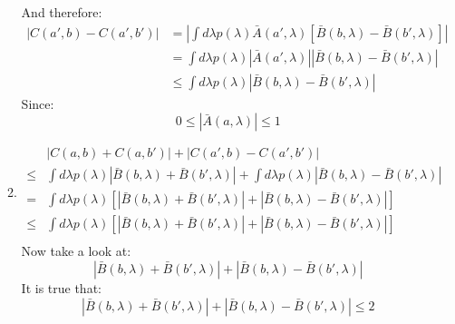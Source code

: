 \documentclass[12pt,a4]{article}
\begin{document}
\begin{enumerate}
\begin{enumerate}
        And therefore:
        \begin{align*}
          |C(a',b) - C(a',b')| 
                             &= \left|\int d\lambda p(\lambda) \bar{A}(a', \lambda)\left[\bar{B}(b, \lambda) - \bar{B}(b', \lambda)\right]\right|\\
                             &= \int d\lambda p(\lambda) \left|\bar{A}(a', \lambda)\right| \left|\bar{B}(b, \lambda) - \bar{B}(b', \lambda)\right|\\
                             &\leq \int d\lambda p(\lambda) \left|\bar{B}(b, \lambda) - \bar{B}(b', \lambda)\right|
        \end{align*}
        Since:
        \begin{equation*}
          0 \le \left|\bar{A}(a, \lambda)\right| \le 1
        \end{equation*}
      \item
        \begin{align*}
          & |C(a,b) + C(a,b')| + |C(a',b) - C(a',b')|\\
          \leq & \int d\lambda p(\lambda) \left|\bar{B}(b, \lambda) + \bar{B}(b', \lambda)\right| + \int d\lambda p(\lambda) \left|\bar{B}(b, \lambda) - \bar{B}(b', \lambda)\right|\\
             = & \int d\lambda p(\lambda) \left[\left|\bar{B}(b, \lambda) + \bar{B}(b', \lambda)\right| + \left|\bar{B}(b, \lambda) - \bar{B}(b', \lambda)\right|\right]\\
          \leq & \int d\lambda p(\lambda) \left[\left|\bar{B}(b, \lambda) + \bar{B}(b', \lambda)\right| + \left|\bar{B}(b, \lambda) - \bar{B}(b', \lambda)\right|\right]\\
        \end{align*}
        Now take a look at:
        \begin{equation*}
          \left|\bar{B}(b, \lambda) + \bar{B}(b', \lambda)\right| + \left|\bar{B}(b, \lambda) - \bar{B}(b', \lambda)\right|
        \end{equation*}
        It is true that:
        \begin{equation*}
          \left|\bar{B}(b, \lambda) + \bar{B}(b', \lambda)\right| + \left|\bar{B}(b, \lambda) - \bar{B}(b', \lambda)\right| \le 2
        \end{equation*}

\end{enumerate}
\end{enumerate}
\end{document}
